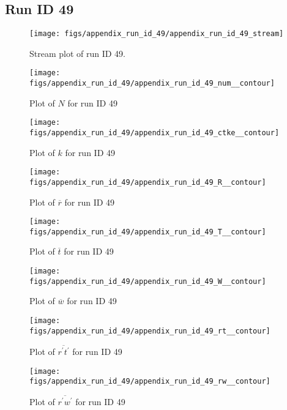 \subsection{Run ID 49}
\begin{figure}[H]
\centering
\texttt{[image: figs/appendix\_run\_id\_49/appendix\_run\_id\_49\_stream]}
\caption{Stream plot of run ID 49.}
\label{fig:appendix_run_id_49_stream}
\end{figure}


\begin{figure}[H]
\centering
\texttt{[image: figs/appendix\_run\_id\_49/appendix\_run\_id\_49\_num\_\_contour]}
\caption{Plot of $N$ for run ID 49}
\label{fig:appendix_run_id_49_num__contour}
\end{figure}


\begin{figure}[H]
\centering
\texttt{[image: figs/appendix\_run\_id\_49/appendix\_run\_id\_49\_ctke\_\_contour]}
\caption{Plot of $k$ for run ID 49}
\label{fig:appendix_run_id_49_ctke__contour}
\end{figure}


\begin{figure}[H]
\centering
\texttt{[image: figs/appendix\_run\_id\_49/appendix\_run\_id\_49\_R\_\_contour]}
\caption{Plot of $\overline{r}$ for run ID 49}
\label{fig:appendix_run_id_49_R__contour}
\end{figure}


\begin{figure}[H]
\centering
\texttt{[image: figs/appendix\_run\_id\_49/appendix\_run\_id\_49\_T\_\_contour]}
\caption{Plot of $\overline{t}$ for run ID 49}
\label{fig:appendix_run_id_49_T__contour}
\end{figure}


\begin{figure}[H]
\centering
\texttt{[image: figs/appendix\_run\_id\_49/appendix\_run\_id\_49\_W\_\_contour]}
\caption{Plot of $\overline{w}$ for run ID 49}
\label{fig:appendix_run_id_49_W__contour}
\end{figure}


\begin{figure}[H]
\centering
\texttt{[image: figs/appendix\_run\_id\_49/appendix\_run\_id\_49\_rt\_\_contour]}
\caption{Plot of $\overline{r^\prime t^\prime}$ for run ID 49}
\label{fig:appendix_run_id_49_rt__contour}
\end{figure}


\begin{figure}[H]
\centering
\texttt{[image: figs/appendix\_run\_id\_49/appendix\_run\_id\_49\_rw\_\_contour]}
\caption{Plot of $\overline{r^\prime w^\prime}$ for run ID 49}
\label{fig:appendix_run_id_49_rw__contour}
\end{figure}


